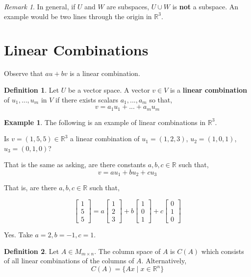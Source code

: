 \documentclass{report}
\theoremstyle{definition}
\newtheorem*{_def}{Definition}
\newtheorem{ex}{Example}[section]
\theoremstyle{remark}
\newtheorem{_rem}{Remark}[section]
\begin{document}
\begin{_rem}
In general, if $U$ and $W$ are subspaces, $U\cup W$ is \textbf{not} a subspace.
An example would be two lines through the origin in $\mathbb{R}^3$.
\end{_rem}

\section{Linear Combinations}

Observe that $au+bv$ is a linear combination.

\begin{_def}
Let $U$ be a vector space.
A vector $v\in V$ is a \textbf{linear combination} of $u_1,...,u_m$ in $V$ if there exists scalars $a_1,...,a_m$ so that,
\[v=a_1u_1+...+a_mu_m\]
\end{_def}

\begin{ex}
The following is an example of linear combinations in $\mathbb{R}^3$.

Is $v=(1,5,5)\in \mathbb{R}^3$ a linear combination of $u_1=(1,2,3)$, $u_2=(1,0,1)$, $u_3=(0,1,0)$?

That is the same as asking, are there constants $a, b, c\in \mathbb{R}$ such that,
\[v=au_1+bu_2+cu_3\]

That is, are there $a,b,c\in \mathbb{R}$ such that,

\[\begin{bmatrix}
1 \\ 5 \\ 5
\end{bmatrix}=a\begin{bmatrix}
1 \\ 2 \\ 3
\end{bmatrix}+b\begin{bmatrix}
1 \\ 0 \\ 1
\end{bmatrix}+c\begin{bmatrix}
0 \\ 1 \\ 0
\end{bmatrix}\]

Yes. Take $a=2, b=-1, c=1$.
\end{ex}

\begin{_def}
Let $A\in M_{m\times n}$.
The column space of $A$ is $C(A)$ which consists of all linear combinations of the columns of $A$.
Alternatively,
\[C(A)=\{Ax\mid x\in \mathbb{R}^n\}\]
\end{_def}
\end{document}
